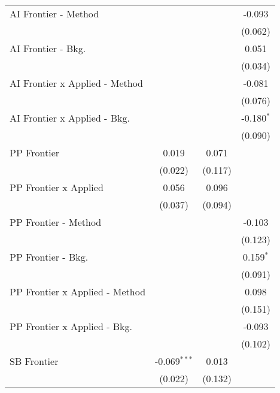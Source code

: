 \begin{tabular}{lccc}
   AI Frontier - Method           &                &                & -0.093\\   
                                  &                &                & (0.062)\\   
   AI Frontier - Bkg.             &                &                & 0.051\\   
                                  &                &                & (0.034)\\   
   AI Frontier x Applied - Method &                &                & -0.081\\   
                                  &                &                & (0.076)\\   
   AI Frontier x Applied - Bkg.   &                &                & -0.180$^{*}$\\   
                                  &                &                & (0.090)\\   
   PP Frontier                    & 0.019          & 0.071          &   \\   
                                  & (0.022)        & (0.117)        &   \\   
   PP Frontier x Applied          & 0.056          & 0.096          &   \\   
                                  & (0.037)        & (0.094)        &   \\   
   PP Frontier - Method           &                &                & -0.103\\   
                                  &                &                & (0.123)\\   
   PP Frontier - Bkg.             &                &                & 0.159$^{*}$\\   
                                  &                &                & (0.091)\\   
   PP Frontier x Applied - Method &                &                & 0.098\\   
                                  &                &                & (0.151)\\   
   PP Frontier x Applied - Bkg.   &                &                & -0.093\\   
                                  &                &                & (0.102)\\   
   SB Frontier                    & -0.069$^{***}$ & 0.013          &   \\   
                                  & (0.022)        & (0.132)        &   \\   

\end{tabular}
